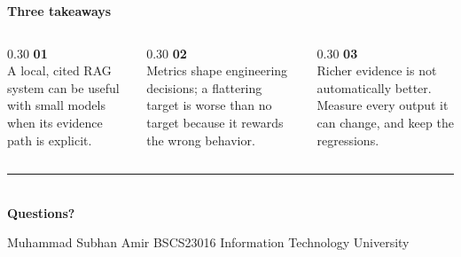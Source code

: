 \documentclass[aspectratio=169,11pt]{beamer}
\begin{document}
\begin{frame}[plain]
  \vspace{1.0em}
  {\color{accent}\Large\bfseries Three takeaways}\par
  \vspace{0.9em}

  \begin{columns}[T,onlytextwidth]
    \begin{column}{0.30\textwidth}
      \textbf{\color{accent}01}\\[0.25em]
      {\small A local, cited RAG system can be useful with small models when its evidence
      path is explicit.}
    \end{column}
    \begin{column}{0.30\textwidth}
      \textbf{\color{accent}02}\\[0.25em]
      {\small Metrics shape engineering decisions; a flattering target is worse than no
      target because it rewards the wrong behavior.}
    \end{column}
    \begin{column}{0.30\textwidth}
      \textbf{\color{accent}03}\\[0.25em]
      {\small Richer evidence is not automatically better. Measure every output it can
      change, and keep the regressions.}
    \end{column}
  \end{columns}

  \vfill
  {\color{rulegrey}\rule{\textwidth}{0.8pt}}\\[0.8em]
  {\color{accent}\fontsize{24}{28}\selectfont\bfseries Questions?}\par
  \vspace{0.25em}
  {\color{soft}\small Muhammad Subhan Amir \quad BSCS23016 \quad Information Technology University}
\end{frame}
\end{document}

